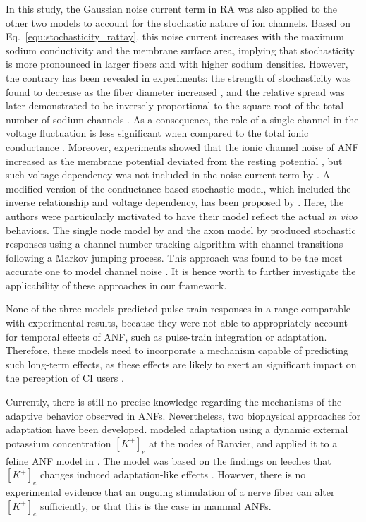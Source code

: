 \documentclass[utf8]{frontiersSCNS} %
\begin{document}
In this study, the Gaussian noise current term in RA was also applied to the other two models to account for the stochastic nature of ion channels. Based on Eq.\ \ref{equ:stochasticity_rattay}, this noise current increases with the maximum sodium conductivity and the membrane surface area, implying that stochasticity is more pronounced in larger fibers and with higher sodium densities. However, the contrary has been revealed in experiments: the strength of stochasticity was found to decrease as the fiber diameter increased \citep{Verveen1962}, and the relative spread was later demonstrated to be inversely proportional to the square root of the total number of sodium channels \citep{Rubinstein1995}. As a consequence, the role of a single channel in the voltage fluctuation is less significant when compared to the total ionic conductance \citep{Rubinstein1995,Badenhorst2016}. Moreover, experiments showed that the ionic channel noise of ANF increased as the membrane potential deviated from the resting potential \citep{Verveen1968}, but such voltage dependency was not included in the noise current term by \cite{Rattay2001}. A modified version of the conductance-based stochastic model, which included the inverse relationship and voltage dependency, has been proposed by \cite{Badenhorst2016}. Here, the authors were particularly motivated to have their model reflect the actual \textit{in vivo} behaviors. The single node model by \cite{Negm2014} and the axon model by \cite{Imennov2009} produced stochastic responses using a channel number tracking algorithm with channel transitions following a Markov jumping process. This approach was found to be the most accurate one to model channel noise \cite{Mino2002}. It is hence worth to further investigate the applicability of these approaches in our framework.

None of the three models predicted pulse-train responses in a range comparable with experimental results, because they were not able to appropriately account for temporal effects of ANF, such as pulse-train integration or adaptation. Therefore, these models need to incorporate a mechanism capable of predicting such long-term effects, as these effects are likely to exert an significant impact on the perception of CI users \citep{Clay2007}.

Currently, there is still no precise knowledge regarding the mechanisms of the adaptive behavior observed in ANFs. Nevertheless, two biophysical approaches for adaptation have been developed. \cite{Woo2009} modeled adaptation using a dynamic external potassium concentration $[K^{+}]_e$ at the nodes of Ranvier, and applied it to a feline ANF model in \cite{Woo2010}. The model was based on the findings on leeches that $[K^{+}]_e$ changes induced adaptation-like effects \citep{Baylor1969}. However, there is no experimental evidence that an ongoing stimulation of a nerve fiber can alter $[K^{+}]_e$ sufficiently, or that this is the case in mammal ANFs.
\end{document}
